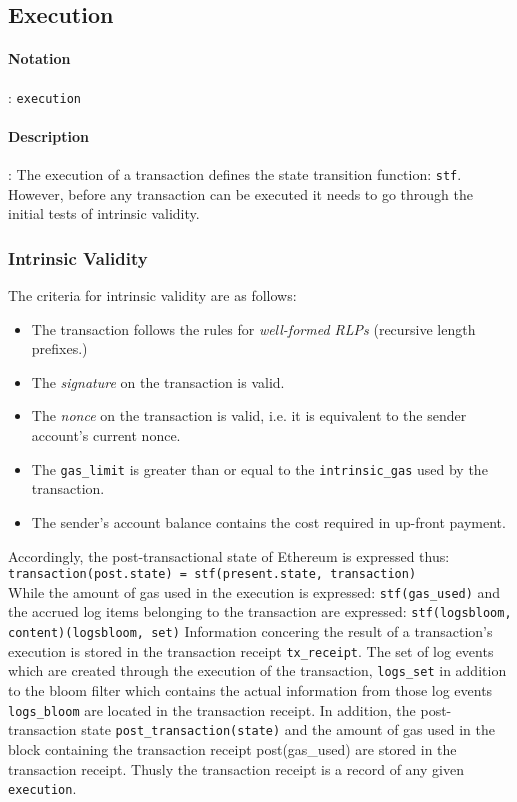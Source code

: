\documentclass[10pt,a4paper,leqno,bibliography=totoc]{scrartcl}
\newenvironment{alphafootnotes}
{\par\edef\savedfootnotenumber{\number\value{footnote}}
\renewcommand{\thefootnote}{\alph{footnote}}
\setcounter{footnote}{0}}
{\par\setcounter{footnote}{\savedfootnotenumber}}
\begin{document}
\begin{alphafootnotes}
\begin{multicols*}{2}
		\subsection{Execution}
			\paragraph{Notation}: \texttt{execution}
			\paragraph{Description}: The execution of a transaction defines the state transition function: \texttt{stf}. However, before any transaction can be executed it needs to go through the initial tests of intrinsic validity. 
			\subsubsection{Intrinsic Validity}
				The criteria for intrinsic validity are as follows:
				\begin{itemize}
				\item The transaction follows the rules for \textsl{well-formed RLPs} (recursive length prefixes.)
				\item The \textsl{signature} on the transaction is valid.
				\item The \textsl{nonce} on the transaction is valid, i.e. it is equivalent to the sender account's current nonce.
				\item The \texttt{gas\_limit} is greater than or equal to the \texttt{intrinsic\_gas} used by the transaction.
				\item The sender's account balance contains the cost required in up-front payment.
				\end{itemize}

				Accordingly, the post-transactional state of Ethereum is expressed thus: 
				\\
				\texttt{transaction(post.state) = stf(present.state, transaction)}  
				\\
				While the amount of gas used in the execution is expressed: \texttt{stf(gas\_used)} and the accrued log items belonging to the transaction are expressed: \texttt{stf(logsbloom, content)(logsbloom, set)} Information concering the result of a transaction's execution is stored in the transaction receipt \texttt{tx\_receipt}. The set of log events which are created through the execution of the transaction, \texttt{logs\_set} in addition to the bloom filter which contains the actual information from those log events \texttt{logs\_bloom} are located in the transaction receipt. In addition, the post-transaction state \texttt{post\_transaction(state)} and the amount of gas used in the block containing the transaction receipt post(gas\_used) are stored in the transaction receipt. Thusly the transaction receipt is a record of any given \texttt{execution}. \par


\end{multicols*}
\end{alphafootnotes}
\end{document}
